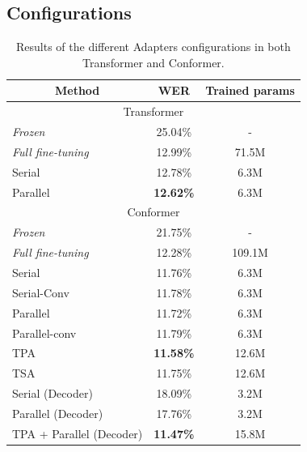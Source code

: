 \subsection{Configurations}
\begin{table}[t]
\caption{Results of the different Adapters configurations in both Transformer and Conformer.}
\begin{center}    
\begin{tabular}{ccc}
\hline
 Method & WER     & Trained params    \\ \hline \hline
\multicolumn{3}{c}{Transformer} \\ \hline
\multicolumn{1}{l}{\textit{Frozen}} & 25.04\%   & - \\
\multicolumn{1}{l}{\textit{Full fine-tuning}} & 12.99\% & 71.5M \\ \hline
\multicolumn{1}{l}{Serial}  &   12.78\% & 6.3M  \\ 
\multicolumn{1}{l}{Parallel}  &     \textbf{12.62\%} & 6.3M  \\ \hline\hline
\multicolumn{3}{c}{Conformer} \\ \hline
\multicolumn{1}{l}{\textit{Frozen}} & 21.75\%   & - \\ 
\multicolumn{1}{l}{\textit{Full fine-tuning}} & 12.28\% & 109.1M \\ \hline
\multicolumn{1}{l}{Serial}  &   11.76\% & 6.3M  \\ %
\multicolumn{1}{l}{Serial-Conv} & 11.78\%     & 6.3M  \\
\multicolumn{1}{l}{Parallel}    & 11.72\% & 6.3M  \\ %
\multicolumn{1}{l}{Parallel-conv} & 11.79\%      & 6.3M  \\ %
\multicolumn{1}{l}{TPA} & \textbf{11.58\%}     & 12.6M  \\ %
\multicolumn{1}{l}{TSA} & 11.75\%     & 12.6M  \\ \hline %
\multicolumn{1}{l}{Serial (Decoder)} & 18.09\%     & 3.2M  \\ 
\multicolumn{1}{l}{Parallel (Decoder)} &17.76\%     & 3.2M  \\ \hline
\multicolumn{1}{l}{TPA + Parallel (Decoder)} & \textbf{11.47\%}     & 15.8M  \\ \hline

\end{tabular}
\end{center}

\label{tab:res}
\end{table}

